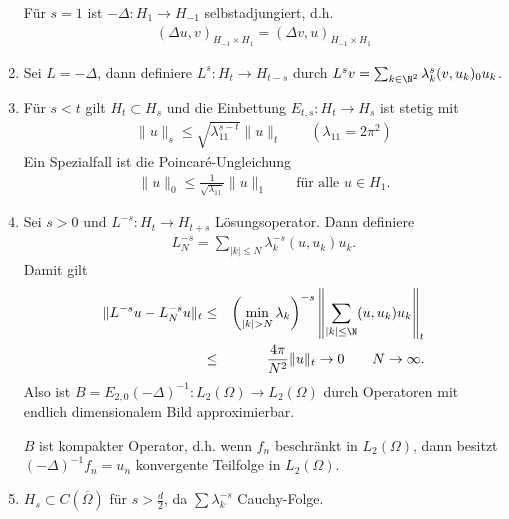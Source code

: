 \begin{Bemerkung}
\begin{enumerate}[1)]
	    Für $s = 1$ ist $-\Delta: H_1 \to H_{-1}$ selbstadjungiert, d.h.
	    \begin{eqnarray*}
            (\Delta u, v)_{H_{-1} \times H_1} = (\Delta v, u)_{H_{-1} \times
            H_1}
	    \end{eqnarray*}
	\item
	    Sei $L = -\Delta$, dann definiere $L^s :H_t \to H_{t-s}$ durch
	    $L^s v = \sum_{k\in\N^2} \lambda_k^s (v, u_k)_0 u_k$.
	\item
	    Für $s < t$ gilt $H_t \subset H_s$ und die Einbettung $E_{t,s}:
	    H_t \to H_s$ ist stetig mit
	    \begin{eqnarray*}
            \|u\|_s \le \sqrt{\lambda_{11}^{s-t}} \|u\|_t
            \qquad (\lambda_{11} = 2 \pi^2)
	    \end{eqnarray*}
	    Ein Spezialfall ist die Poincar\'e-Ungleichung
	    \begin{eqnarray*}
            \|u\|_0 \le \frac{1}{\sqrt{\lambda_{11}}} \|u\|_1
            \qquad \text{für alle } u \in H_1.
	    \end{eqnarray*}
	\item
	    Sei $s > 0$ und $L^{-s}: H_t \to H_{t+s}$ Lösungsoperator. Dann
	    definiere
	    \begin{eqnarray*}
              L_N^{-s}
            = \sum_{|k|\le N} \lambda_k^{-s} (u, u_k) u_k.
	    \end{eqnarray*}
	    Damit gilt
	    \begin{eqnarray*}
                  \|L^{-s} u - L_N^{-s} u\|_t
            &\le& \left(\min_{|k|>N} \lambda_k\right)^{-s}
                  \left\|\sum_{|k|\le\N} (u, u_k) u_k\right\|_t \\
            &\le& \frac{4 \pi}{N^2} \|u\|_t
            \to   0 \qquad N \to \infty.
	    \end{eqnarray*}
	    Also ist $B = E_{2,0} (-\Delta)^{-1}: L_2(\Omega) \to L_2(\Omega)$
	    durch Operatoren mit endlich dimensionalem Bild approximierbar.

	    $B$ ist kompakter Operator, d.h. wenn $f_n$  beschränkt in
	    $L_2(\Omega)$, dann besitzt $(-\Delta)^{-1} f_n = u_n$ konvergente
	    Teilfolge in $L_2(\Omega)$.
	\item
	    $H_s \subset C(\overline \Omega)$ für $s > \frac{d}{2}$, da
	    $\sum \lambda_k^{-s}$ Cauchy-Folge.
    \end{enumerate}
\end{Bemerkung}
